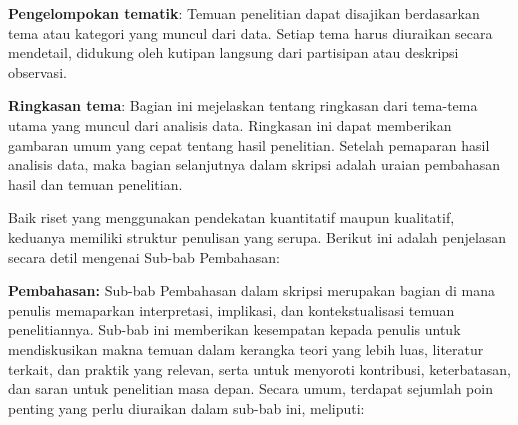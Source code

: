 \documentclass[
  indonesian,
  letterpaper,
]{scrbook}
\begin{document}
\textbf{Pengelompokan tematik}: Temuan penelitian dapat disajikan
berdasarkan tema atau kategori yang muncul dari data. Setiap tema harus
diuraikan secara mendetail, didukung oleh kutipan langsung dari
partisipan atau deskripsi observasi.

\textbf{Ringkasan tema}: Bagian ini mejelaskan tentang ringkasan dari
tema-tema utama yang muncul dari analisis data. Ringkasan ini dapat
memberikan gambaran umum yang cepat tentang hasil penelitian. Setelah
pemaparan hasil analisis data, maka bagian selanjutnya dalam skripsi
adalah uraian pembahasan hasil dan temuan penelitian.

Baik riset yang menggunakan pendekatan kuantitatif maupun kualitatif,
keduanya memiliki struktur penulisan yang serupa. Berikut ini adalah
penjelasan secara detil mengenai Sub-bab Pembahasan:

\textbf{Pembahasan:} Sub-bab Pembahasan dalam skripsi merupakan bagian
di mana penulis memaparkan interpretasi, implikasi, dan kontekstualisasi
temuan penelitiannya. Sub-bab ini memberikan kesempatan kepada penulis
untuk mendiskusikan makna temuan dalam kerangka teori yang lebih luas,
literatur terkait, dan praktik yang relevan, serta untuk menyoroti
kontribusi, keterbatasan, dan saran untuk penelitian masa depan. Secara
umum, terdapat sejumlah poin penting yang perlu diuraikan dalam sub-bab
ini, meliputi:
\end{document}
